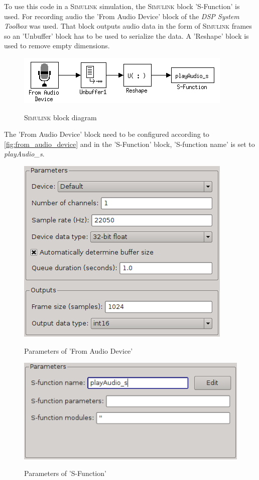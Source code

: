 \documentclass[journal]{IEEEtran}
\begin{document}
To use this code in a \textsc{Simulink} simulation, the \textsc{Simulink} block 'S-Function' is used. For recording audio the 'From Audio Device' block of the \emph{DSP System Toolbox} was used. That block outputs audio data in the form of \textsc{Simulink} frames so an 'Unbuffer' block has to be used to serialize the data. A 'Reshape' block is used to remove empty dimensions.

\begin{figure}[ht]
\begin{center}
\includegraphics[scale=0.8]{simulink}
\label{fig:simulink}
\caption{\textsc{Simulink} block diagram}
\end{center}
\end{figure}

The 'From Audio Device' block need to be configured according to \autoref*{fig:from_audio_device} and in the 'S-Function' block, 'S-function name' is set to \emph{playAudio\_s}.

\begin{figure}[ht]
\begin{center}
\includegraphics[scale=0.8]{from_audio_device}
\label{fig:from_audio_device}
\caption{Parameters of 'From Audio Device'}
\end{center}
\end{figure}

\begin{figure}[ht]
\begin{center}
\includegraphics[scale=0.8]{s-function}
\label{fig:s-function}
\caption{Parameters of 'S-Function'}
\end{center}
\end{figure}
\end{document}
